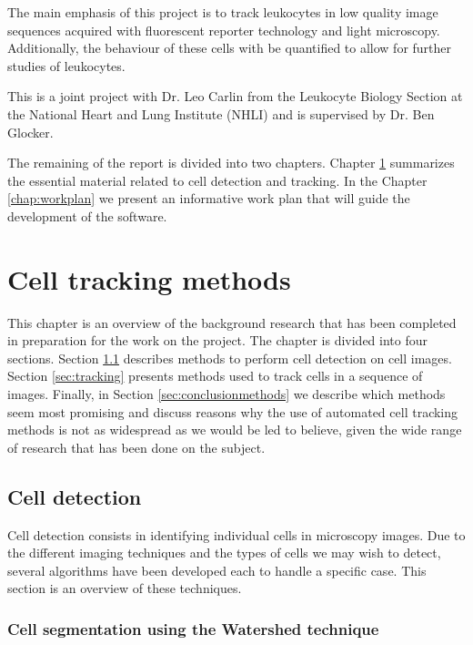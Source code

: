 \documentclass[12pt,a4paper,openany]{book}
\begin{document}
The main emphasis of this project is to track leukocytes in low quality image sequences acquired with fluorescent reporter technology and light microscopy. Additionally, the behaviour of these cells with be quantified to allow for further studies of leukocytes.

This is a joint project with Dr. Leo Carlin from the Leukocyte Biology Section at the National Heart and Lung Institute (NHLI) and is supervised by Dr. Ben Glocker.

The remaining of the report is divided into two chapters. Chapter \ref{chap:methodoverview} summarizes the essential material related to cell detection and tracking. In the Chapter \ref{chap:workplan} we present an informative work plan that will guide the development of the software. 



\chapter{Cell tracking methods}
\label{chap:methodoverview}

This chapter is an overview of the background research that has been completed in preparation for the work on the project. The chapter is divided into four sections. Section \ref{sec:detection} describes methods to perform cell detection on cell images. Section \ref{sec:tracking} presents methods used to track cells in a sequence of images. Finally, in Section \ref{sec:conclusionmethods} we describe which methods seem most promising and discuss reasons why the use of automated cell tracking methods is not as widespread as we would be led to believe, given the wide range of research that has been done on the subject.


\section{Cell detection}
\label{sec:detection}

Cell detection consists in identifying individual cells in microscopy images. Due to the different imaging techniques and the types of cells we may wish to detect, several algorithms have been developed each to handle a specific case. This section is an overview of these techniques.

\subsection{Cell segmentation using the Watershed technique}
\end{document}
